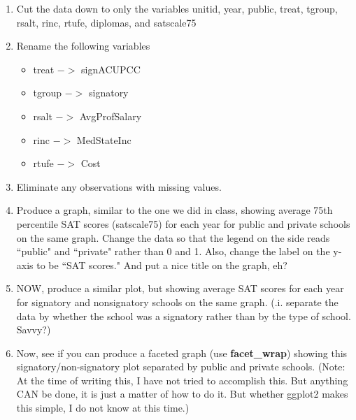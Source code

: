 \documentclass[11pt]{article}
\begin{document}
\begin{enumerate}

\item Cut the data down to only the variables unitid, year, public, treat, tgroup, rsalt, rinc, rtufe, diplomas, and satscale75

\item Rename the following variables
     \begin{itemize}
     \item treat $->$ signACUPCC
     \item tgroup $->$ signatory
     \item rsalt $->$ AvgProfSalary
     \item rinc $->$ MedStateInc
     \item rtufe $->$ Cost
     \end{itemize} 
     
 \item Eliminate any observations with missing values. 
     
\item Produce a graph, similar to the one we did in class, showing average 75th percentile SAT scores (satscale75) for each year for public and private schools on the same graph. Change the data so that the legend on the side reads ``public" and ``private" rather than 0 and 1. Also, change the label on the y-axis to be ``SAT scores." And put a nice title on the graph, eh? 

\item NOW, produce a similar plot, but showing average SAT scores for each year for signatory and nonsignatory schools on the same graph. (.i. separate the data by whether the school was a signatory rather than by the type of school. Savvy?)

\item Now, see if you can produce a faceted graph (use \textbf{facet\_wrap}) showing this signatory/non-signatory plot separated by public and private schools. (Note: At the time of writing this, I have not tried to accomplish this. But anything CAN be done, it is just a matter of how to do it. But whether ggplot2 makes this simple, I do not know at this time.)
 


\end{enumerate}
\end{document}
